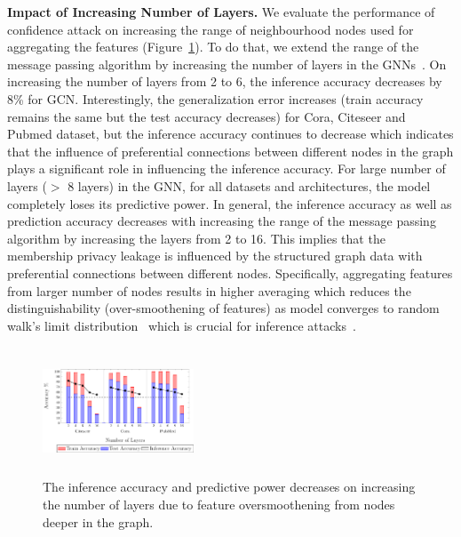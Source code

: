 \textbf{Impact of Increasing Number of Layers.} We evaluate the performance of confidence attack on increasing the range of neighbourhood nodes used for aggregating the features (Figure~\ref{fig:numlayers}).
To do that, we extend the range of the message passing algorithm by increasing the number of layers in the GNNs~\cite{klicpera2018combining,Li2018DeeperII}.
On increasing the number of layers from 2 to 6, the inference accuracy decreases by 8\% for GCN. %
Interestingly, the generalization error increases (train accuracy remains the same but the test accuracy decreases) for Cora, Citeseer and Pubmed dataset, but the inference accuracy continues to decrease which indicates that the influence of preferential connections between different nodes in the graph plays a significant role in influencing the inference accuracy. %
For large number of layers ($>$ 8 layers) in the GNN, for all datasets and architectures, the model completely loses its predictive power.
In general, the inference accuracy as well as prediction accuracy decreases with increasing the range of the message passing algorithm by increasing the layers from 2 to 16.
This implies that the membership privacy leakage is influenced by the structured graph data with preferential connections between different nodes.
Specifically, aggregating features from larger number of nodes results in higher averaging which reduces the distinguishability (over-smoothening of features) as model converges to random walk’s limit distribution~\cite{klicpera2018combining,Li2018DeeperII} which is crucial for inference attacks~\cite{membershipinf,ndss19salem}.


\begin{figure}[!htb]
\centering
\includegraphics[width=0.4\textwidth,height=3.8cm]{./figures/BBMIA/gsage_numlayers.pdf}
\caption{The inference accuracy and predictive power decreases on increasing the number of layers due to feature oversmoothening from nodes deeper in the graph.}
\label{fig:numlayers}
\end{figure}





